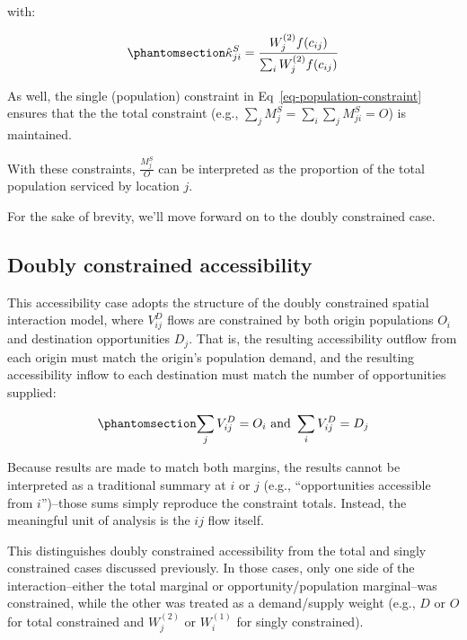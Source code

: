 \documentclass[
  10pt,
  letterpaper,
]{article}
\begin{document}
\noindent with:

\begin{equation}\phantomsection\label{eq-attraction-constrained-proportional-allocation-factor}{
\hat \kappa^S_{ji} = \frac{W_j^{(2)} f(c_{ij})}{\sum_i W_j^{(2)} f(c_{ij})}
}\end{equation}

As well, the single (population) constraint in
Eq~\ref{eq-population-constraint} ensures that the the total constraint
(e.g., \(\sum_j M^S_{j} = \sum_i\sum_j  M^S_{ji} = O\)) is maintained.

With these constraints, \(\frac{M_j^S}{O}\) can be interpreted as the
proportion of the total population serviced by location \(j\).

For the sake of brevity, we'll move forward on to the doubly constrained
case.

\subsection{Doubly constrained
accessibility}\label{doubly-constrained-accessibility}

This accessibility case adopts the structure of the doubly constrained
spatial interaction model, where \(V_{ij}^D\) flows are constrained by
both origin populations \(O_i\) and destination opportunities \(D_j\).
That is, the resulting accessibility outflow from each origin must match
the origin's population demand, and the resulting accessibility inflow
to each destination must match the number of opportunities supplied:

\begin{equation}\phantomsection\label{eq-opportunity-population-equality-1}{
\sum_j V_{ij}^D = O_i \text{ and }  \sum_i V_{ij}^D =  D_j
}\end{equation}

Because results are made to match both margins, the results cannot be
interpreted as a traditional summary at \(i\) or \(j\) (e.g.,
``opportunities accessible from \(i\)'')--those sums simply reproduce
the constraint totals. Instead, the meaningful unit of analysis is the
\(ij\) flow itself.

This distinguishes doubly constrained accessibility from the total and
singly constrained cases discussed previously. In those cases, only one
side of the interaction--either the total marginal or
opportunity/population marginal--was constrained, while the other was
treated as a demand/supply weight (e.g., \(D\) or \(O\) for total
constrained and \(W_j^{(2)}\) or \(W_i^{(1)}\) for singly constrained).
\end{document}
